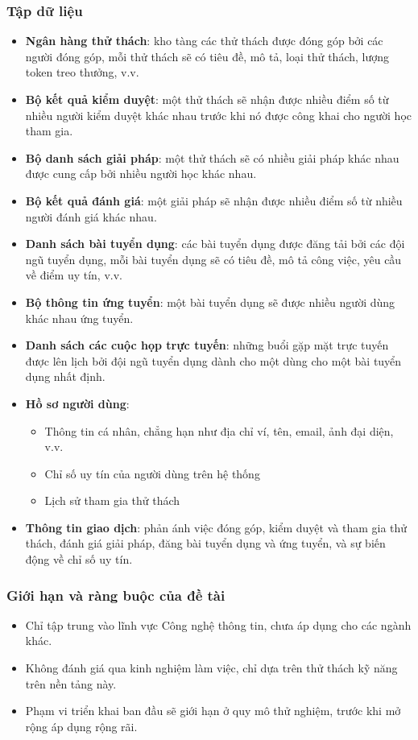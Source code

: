\documentclass{article}[14pt]
\begin{document}
{  \subsubsection{Tập dữ liệu}
  \begin{itemize}
      \item \textbf{Ngân hàng thử thách}: kho tàng các thử thách được đóng góp bởi các người đóng góp, mỗi thử thách sẽ có tiêu đề, mô tả, loại thử thách, lượng token treo thưởng, v.v.
      \item \textbf{Bộ kết quả kiểm duyệt}: một thử thách sẽ nhận được nhiều điểm số từ nhiều người kiểm duyệt khác nhau trước khi nó được công khai cho người học tham gia.
      \item \textbf{Bộ danh sách giải pháp}: một thử thách sẽ có nhiều giải pháp khác nhau được cung cấp bởi nhiều người học khác nhau.
      \item \textbf{Bộ kết quả đánh giá}: một giải pháp sẽ nhận được nhiều điểm số từ nhiều người đánh giá khác nhau.
      \item \textbf{Danh sách bài tuyển dụng}: các bài tuyển dụng được đăng tải bởi các đội ngũ tuyển dụng, mỗi bài tuyển dụng sẽ có tiêu đề, mô tả công việc, yêu cầu về điểm uy tín, v.v.
      \item \textbf{Bộ thông tin ứng tuyển}: một bài tuyển dụng sẽ được nhiều người dùng khác nhau ứng tuyển.
      \item \textbf{Danh sách các cuộc họp trực tuyến}: những buổi gặp mặt trực tuyến được lên lịch bởi đội ngũ tuyển dụng dành cho một dùng cho một bài tuyển dụng nhất định.
      \item \textbf{Hồ sơ người dùng}:
            \begin{itemize}
                \item Thông tin cá nhân, chẳng hạn như địa chỉ ví, tên, email, ảnh đại diện, v.v.
                \item Chỉ số uy tín của người dùng trên hệ thống
                \item Lịch sử tham gia thử thách
            \end{itemize}
      \item \textbf{Thông tin giao dịch}: phản ánh việc đóng góp, kiểm duyệt và tham gia thử thách, đánh giá giải pháp, đăng bài tuyển dụng và ứng tuyển, và sự biến động về chỉ số uy tín.
  \end{itemize}

  \subsubsection{Giới hạn và ràng buộc của đề tài}
  \begin{itemize}
      \item Chỉ tập trung vào lĩnh vực Công nghệ thông tin, chưa áp dụng cho các ngành khác.
      \item Không đánh giá qua kinh nghiệm làm việc, chỉ dựa trên thử thách kỹ năng trên nền tảng này.
      \item Phạm vi triển khai ban đầu sẽ giới hạn ở quy mô thử nghiệm, trước khi mở rộng áp dụng rộng rãi.
  \end{itemize}

}
\end{document}
